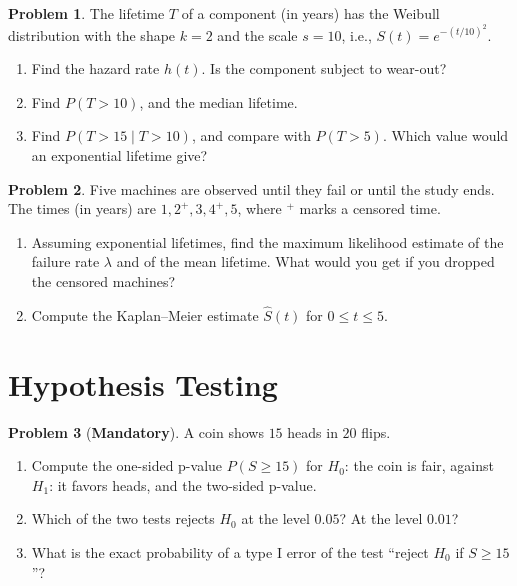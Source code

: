 \documentclass[11pt]{article}
\theoremstyle{definition}
\newtheorem{problem}{Problem}[section]
\newcommand{\mandatory}{\textcolor{red!70!black}{\textbf{Mandatory}}}
\begin{document}
\begin{problem}\label{pr:hazard-practice}
    The lifetime $T$ of a component (in years) has the Weibull distribution with the shape $k = 2$ and the scale $s = 10$, i.e., $S(t) = e^{-(t/10)^2}$.
    \begin{enumerate}[label=(\alph*)]
        \item Find the hazard rate $h(t)$. Is the component subject to wear-out?
        \item Find $P(T > 10)$, and the median lifetime.
        \item Find $P(T > 15 \mid T > 10)$, and compare with $P(T > 5)$. Which value would an exponential lifetime give?
    \end{enumerate}
\end{problem}

\begin{problem}\label{pr:censored-practice}
    Five machines are observed until they fail or until the study ends. The times (in years) are $1, 2^+, 3, 4^+, 5$, where $^+$ marks a censored time.
    \begin{enumerate}[label=(\alph*)]
        \item Assuming exponential lifetimes, find the maximum likelihood estimate of the failure rate $\lambda$ and of the mean lifetime. What would you get if you dropped the censored machines?
        \item Compute the Kaplan--Meier estimate $\hat S(t)$ for $0 \leq t \leq 5$.
    \end{enumerate}
\end{problem}

\section{Hypothesis Testing}

\begin{problem}[\mandatory]\label{pr:coin-test}
    A coin shows $15$ heads in $20$ flips.
    \begin{enumerate}[label=(\alph*)]
        \item Compute the one-sided p-value $P(S \geq 15)$ for $H_0$: the coin is fair, against $H_1$: it favors heads, and the two-sided p-value.
        \item Which of the two tests rejects $H_0$ at the level $0.05$? At the level $0.01$?
        \item What is the exact probability of a type I error of the test ``reject $H_0$ if $S \geq 15$''?
    \end{enumerate}
\end{problem}
\end{document}
